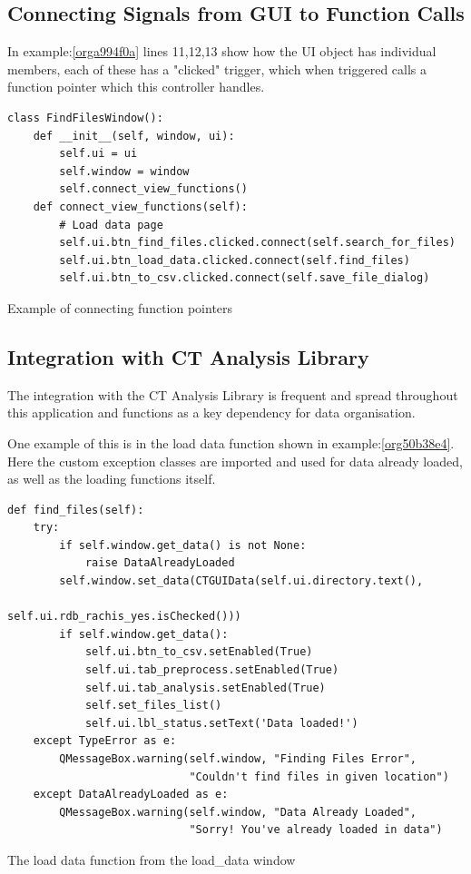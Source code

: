 \documentclass[11pt]{report}
\begin{document}
\subsection{Connecting Signals from GUI to Function Calls}
\label{sec:org848ca35}
In example:\ref{orga994f0a} lines 11,12,13 show how the UI object has individual members, each of these has a "clicked" trigger, which when triggered calls a function pointer which this controller handles.
\begin{listing}[htbp]
\begin{verbatim}
class FindFilesWindow():
    def __init__(self, window, ui):
        self.ui = ui
        self.window = window
        self.connect_view_functions()
    def connect_view_functions(self):
        # Load data page
        self.ui.btn_find_files.clicked.connect(self.search_for_files)
        self.ui.btn_load_data.clicked.connect(self.find_files)
        self.ui.btn_to_csv.clicked.connect(self.save_file_dialog)
\end{verbatim}
\caption{\label{orga994f0a}
Example of connecting function pointers}
\end{listing}

\subsection{Integration with CT Analysis Library}
\label{sec:orgb39ad04}

The integration with the CT Analysis Library is frequent and spread throughout this application and functions as a key dependency for data organisation.

One example of this is in the load data function shown in example:\ref{org50b38e4}. Here the custom exception classes are imported and used for data already loaded, as well as the loading functions itself.

\begin{listing}[htbp]
\begin{verbatim}
def find_files(self):
    try:
        if self.window.get_data() is not None:
            raise DataAlreadyLoaded
        self.window.set_data(CTGUIData(self.ui.directory.text(),
                                       self.ui.rdb_rachis_yes.isChecked()))
        if self.window.get_data():
            self.ui.btn_to_csv.setEnabled(True)
            self.ui.tab_preprocess.setEnabled(True)
            self.ui.tab_analysis.setEnabled(True)
            self.set_files_list()
            self.ui.lbl_status.setText('Data loaded!')
    except TypeError as e:
        QMessageBox.warning(self.window, "Finding Files Error",
                            "Couldn't find files in given location")
    except DataAlreadyLoaded as e:
        QMessageBox.warning(self.window, "Data Already Loaded",
                            "Sorry! You've already loaded in data")
\end{verbatim}
\caption{\label{org50b38e4}
The load data function from the load\_data window}
\end{listing}
\end{document}
